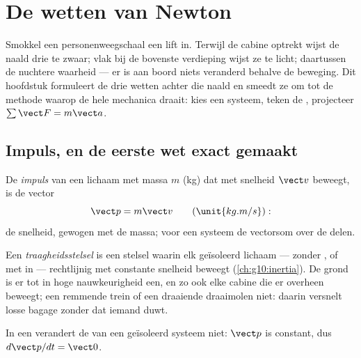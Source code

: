 \chapter{De wetten van Newton}\label{ch:g12:newtons-laws}

Smokkel een personenweegschaal een lift in. Terwijl de cabine optrekt wijst de naald
drie  te zwaar; vlak bij de bovenste verdieping wijst ze te licht; daartussen
de nuchtere waarheid --- er is aan boord niets veranderd behalve de beweging. Dit
hoofdstuk formuleert de drie wetten achter die naald en smeedt ze om tot de methode
waarop de hele mechanica draait: kies een systeem, teken de , projecteer
$\sum \vect F = m\vect a$.

\section{Impuls, en de eerste wet exact gemaakt}

\begin{definition}[Impuls]\label{def:g12:newtons-laws:momentum}
De \emph{impuls} van een lichaam met massa $m$ (\unit{kg}) dat met
snelheid $\vect v$ beweegt, is de vector
\[
\vect p = m \vect v \qquad (\unit{kg.m/s}):
\]
de snelheid, gewogen met de massa; voor een systeem de vectorsom over de delen.
\end{definition}

\begin{definition}[Traagheidsstelsel]\label{def:g12:newtons-laws:inertial}
Een \emph{traagheidsstelsel} is een stelsel waarin elk
geïsoleerd lichaam --- zonder , of met  in  --- rechtlijnig
met constante snelheid beweegt (\cref{ch:g10:inertia}). De grond is er tot in hoge
nauwkeurigheid een, en zo ook elke cabine die er  overheen
beweegt; een remmende trein of een draaiende draaimolen niet: daarin versnelt losse
bagage zonder dat iemand duwt.
\end{definition}

\begin{theorem}\label{thm:g12:newtons-laws:first}
In een  verandert de  van een geïsoleerd systeem niet:
$\vect p$ is constant, dus $d\vect p/dt = \vect 0$.
\end{theorem}
\admitted

